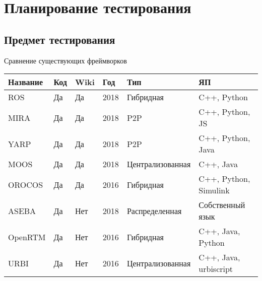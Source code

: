\section{Планирование тестирования}

\subsection{Предмет тестирования}

\begin{frame}{Сравнение существующих фреймворков}
	\vspace{-0.4cm}
	\begin{table}[h!]
		\small
		\centering
		\def\arraystretch{1.3}
		\begin{tabular}{|p{1.2cm} p{0.5cm} p{0.5cm} p{0.5cm} p{2.5cm} p{2.3cm}|}
			\hline
			\textbf{Название}     & \textbf{Код} & \textbf{Wiki} & \textbf{Год} & \textbf{Тип}    & \textbf{ЯП} \\ \hline
			\rowcolor{gray!30}
			ROS          & Да           & Да                            & 2018 & Гибридная              & C++, Python  \\ \hline\hline
			\rowcolor{gray!30}
			MIRA & Да & Да & 2018 & P2P     & C++, Python, JS   \\ \hline\hline
			\rowcolor{gray!30}
			YARP         & Да           & Да                            & 2018 & P2P     & C++, Python, Java \\ \hline\hline
			MOOS         & Да           & Да                            & 2018 & Централизованная       & C++, Java         \\ \hline
			OROCOS  & Да & Да  & 2016 & Гибридная              & C++, Python, Simulink    \\ \hline
			ASEBA        & Да           & Нет                           & 2018 & Распределенная         & Собственный язык  \\ \hline		
			OpenRTM & Да           & Нет                           & 2016 & Гибридная              & C++, Java, Python        \\ \hline
			URBI         & Да           & Нет                           & 2016 & Централизованная       & C++, Java, urbiscript    \\ \hline
		\end{tabular}
	\end{table}

\end{frame}

